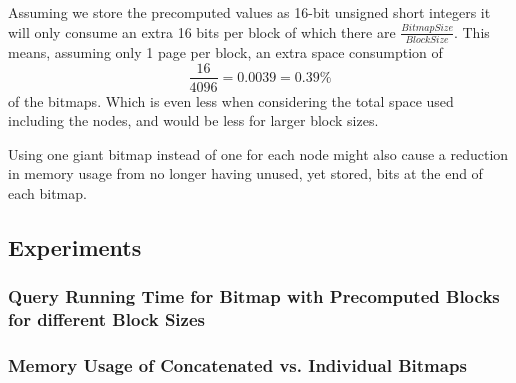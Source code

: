Assuming we store the precomputed values as 16-bit unsigned short integers it will only consume an extra 16 bits per block of which there are $\frac{BitmapSize}{BlockSize}$.
This means, assuming only 1 page per block, an extra space consumption of
\[ \frac{16}{4096} = 0.0039 = 0.39\% \]
of the bitmaps.
Which is even less when considering the total space used including the nodes, and would be less for larger block sizes.

Using one giant bitmap instead of one for each node might also cause a reduction in memory usage from no longer having unused, yet stored, bits at the end of each bitmap.


\subsection{Experiments}
\subsubsection{Query Running Time for Bitmap with Precomputed Blocks for different Block Sizes}

\subsubsection{Memory Usage of Concatenated vs. Individual Bitmaps}